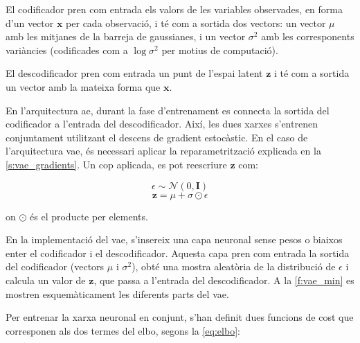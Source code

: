 \documentclass[CAT,BIB]{TFUOC}%
\begin{document}
        El codificador pren com entrada els valors de les variables observades,
        en forma d'un vector $\mathbf{x}$ per cada observació,
        i té com a sortida dos vectors:
        un vector $\mu$ amb les mitjanes de la barreja de gaussianes,
        i un vector $\sigma^2$ amb les corresponents variàncies
        (codificades com a $\log \sigma^2$ per motius de computació).

        El descodificador pren com entrada un punt de l'espai latent $\mathbf{z}$
        i té com a sortida un vector amb la mateixa forma que $\mathbf{x}$.

        En l'arquitectura \gls{ae},
        durant la fase d'entrenament
        es connecta la sortida del codificador a l'entrada del descodificador.
        Així, les dues xarxes s'entrenen conjuntament
        utilitzant el descens de gradient estocàstic.
        En el caso de l'arquitectura \gls{vae},
        és necessari aplicar la reparametrització
        explicada en la \cref{s:vae_gradients}.
        Un cop aplicada, es pot reescriure $\mathbf{z}$ com:

        $$\epsilon \sim \mathcal{N}(0, \mathbf{I})$$
        $$\mathbf{z} = \mu + \sigma \odot \epsilon$$

        on $\odot$ és el producte per elements.

        En la implementació del \gls{vae},
        s'insereix una capa neuronal sense pesos o biaixos
        enter el codificador i el descodificador.
        Aquesta capa pren com entrada la sortida del codificador
        (vectors $\mu$ i $\sigma^2$),
        obté una mostra aleatòria de la distribució de $\epsilon$
        i calcula un valor de $\mathbf{z}$,
        que passa a l'entrada del descodificador.
        A la \cref{f:vae_min} es mostren esquemàticament
        les diferents parts del \gls{vae}.

        Per entrenar la xarxa neuronal en conjunt,
        s'han definit dues funcions de cost
        que corresponen als dos termes del \gls{elbo},
        segons la \cref{eq:elbo}:
\end{document}
